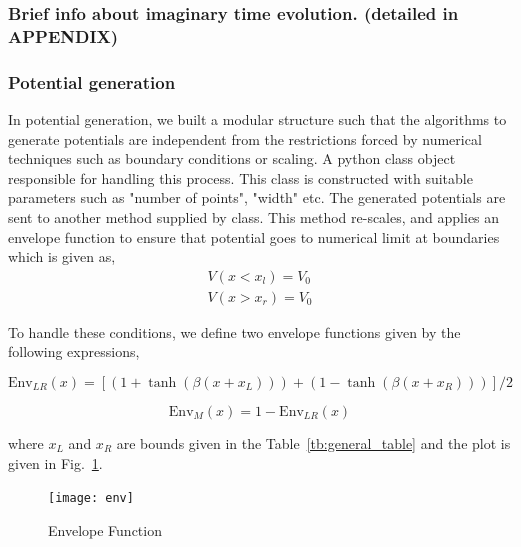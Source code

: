\documentclass[a4paper,times,hidelinks,12pt]{article}
\begin{document}
\subsubsection{Brief info about imaginary time evolution. (detailed in APPENDIX)}
\subsubsection{Potential generation} \label{sec:potential_generation}

In potential generation, we built a modular structure such that the algorithms to generate potentials are independent from the restrictions forced by numerical techniques such as boundary conditions or scaling. A python class object responsible for handling this process. This class is constructed with suitable parameters such as "number of points", "width" etc. The generated potentials are sent to another method supplied by class. This method re-scales, and applies an envelope function to ensure that potential goes to numerical limit at boundaries which is given as,
\begin{equation}
\label{eq:potential_boundary_conditions}
\begin{split}
    V(x < x_l) = V_0 \\ 
    V(x > x_r) = V_0
\end{split}
\end{equation}

To handle these conditions, we define two envelope functions given by the following expressions, 

\begin{equation}
\label{eq:envelope_potential_lr}
    \text{Env}_{LR}(x) = [(1 + \tanh{(\beta(x + x_L))}) + (1 - \tanh{(\beta(x + x_R))})]/2
\end{equation}

\begin{equation}
\label{eq:envelope_potential_m}
    \text{Env}_{M}(x) = 1 - \text{Env}_{LR}(x)
\end{equation}

where $x_L$ and $x_R$ are bounds given in the Table~\eqref{tb:general_table} and the plot is given in Fig.~\ref{fig:envelope_and_random_withot_pros}.  

\graphicspath{{"../figs/potentials/"}}
\begin{figure}[H]
\centering
\texttt{[image: env]}
\caption{Envelope Function}
\label{fig:envelope_and_random_withot_pros}
\end{figure}
\end{document}
